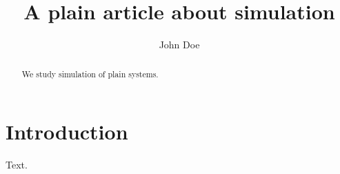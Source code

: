 \documentclass{article}
\title{A plain article about simulation}
\author{John Doe}
\begin{document}
\maketitle

\begin{abstract}
We study simulation of plain systems.
\end{abstract}

\section{Introduction}
Text.
\end{document}
